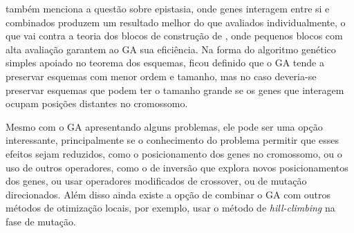 \citeauthor{Spall2003} também menciona a questão sobre epistasia, onde genes interagem entre si e combinados produzem um resultado melhor do que avaliados individualmente, o que vai contra a teoria dos blocos de construção de \citeauthor{Goldberg1989}, onde pequenos blocos com alta avaliação garantem ao GA sua eficiência. Na forma do algoritmo genético simples apoiado no teorema dos esquemas, ficou definido que o GA tende a preservar esquemas com menor ordem e tamanho, mas no caso deveria-se preservar esquemas que podem ter o tamanho grande se os genes que interagem ocupam posições distantes no cromossomo.

Mesmo com o GA apresentando alguns problemas, ele pode ser uma opção interessante, principalmente se o conhecimento do problema permitir que esses efeitos sejam reduzidos, como o posicionamento dos genes no cromossomo, ou o uso de outros operadores, como o de inversão que explora novos posicionamentos dos genes, ou usar operadores modificados de crossover, ou de mutação direcionados. Além disso ainda existe a opção de combinar o GA com outros métodos de otimização locais, por exemplo, usar o método de \textit{hill-climbing} na fase de mutação.

